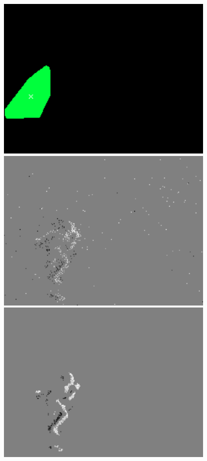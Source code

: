 \begin{figure}
\begin{minipage}{0.33\textwidth}
        \includegraphics[width = 0.95\textwidth]{images/obst_run1.png}
    \end{minipage}
        \begin{minipage}{0.33\textwidth}
        \centering
        \includegraphics[width = 0.95\textwidth]{images/unfiltered_run2.png}
    \end{minipage}\hfill
    \begin{minipage}{0.33\textwidth}
        \centering
        \includegraphics[width = 0.95\textwidth]{images/filtered_run2.png}

\end{minipage}
\end{figure}
